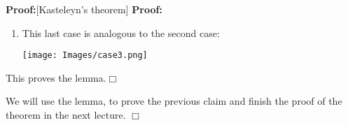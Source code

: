 \documentclass[11pt]{article}
\newenvironment{proof}{\noindent \textbf{Proof:}}{$\Box$}
\begin{document}
\begin{proof}[Kasteleyn's theorem]
\begin{proof}
\begin{itemize}
\begin{enumerate}
\begin{multicols}{3}
\texttt{[image: Images/case2.png]}

$k'=k-1$

$l'=l$

$V'=V$ 

$H'=H-2$
\end{multicols}

Hence we get, using our inductive hypothesis, 

\begin{eqnarray}
\pi	&=&	\pi' \frac{1}{i^2}\\
	&=& -(-1)^{k'+l'-1}\\
	&=& (-1)^{k+l-1}
\end{eqnarray}


\item  This last case is analogous to the second case:
	\begin{center}
 	\texttt{[image: Images/case3.png]}
	\end{center}
\end{enumerate}


\end{itemize}
This proves the lemma.\end{proof}

We will use the lemma, to prove the previous claim and finish the proof of the theorem in the next lecture.
\end{proof}
\end{document}
